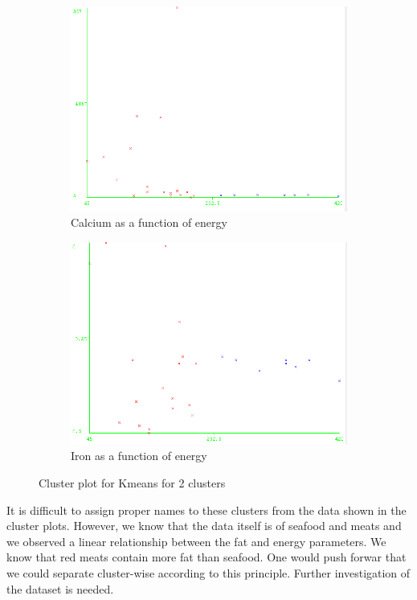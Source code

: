 \documentclass[letterpaper,12pt]{article}
\begin{document}
\begin{figure}[H]
\begin{subfigure}{.4\textwidth}
  \centering
  \includegraphics[width=.8\linewidth]{kmeans_seed10_2cl_energy_calcium}  
  \caption{Calcium as a function of energy}
  \label{fig:sub-third_1}
\end{subfigure}
\begin{subfigure}{.4\textwidth}
  \centering
  \includegraphics[width=.8\linewidth]{kmeans_seed10_2cl_energy_iron}  
  \caption{Iron as a function of energy}
  \label{fig:sub-fourth_1}
\end{subfigure}
\caption{Cluster plot for Kmeans for 2 clusters}
\label{fig:fig_1}
\end{figure}

It is difficult to assign proper names to these clusters from the data shown in the cluster plots. However, we know that the data itself is of seafood and meats and we observed a linear relationship between the fat and energy parameters. We know that red meats contain more fat than seafood. One would push forwar that we could separate cluster-wise according to this principle. Further investigation of the dataset is needed.
\end{document}
